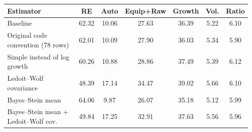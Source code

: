 \begin{tabular}{lcccccc}
\toprule
\textbf{Estimator} & RE & Auto & Equip+Raw & Growth & Vol. & Ratio \\
\midrule
Baseline & 62.32 & 10.06 & 27.63 & 36.39 & 5.22 & 6.10 \\
Original code convention (78 rows) & 62.01 & 10.09 & 27.90 & 36.03 & 5.34 & 5.90 \\
Simple instead of log growth & 60.26 & 10.88 & 28.86 & 37.49 & 5.39 & 6.12 \\
Ledoit--Wolf covariance & 48.39 & 17.14 & 34.47 & 39.02 & 5.66 & 6.10 \\
Bayes--Stein mean & 64.06 & 9.87 & 26.07 & 35.18 & 5.12 & 5.99 \\
Bayes--Stein mean + Ledoit--Wolf cov. & 49.84 & 17.25 & 32.91 & 37.63 & 5.56 & 5.96 \\
\bottomrule
\end{tabular}
